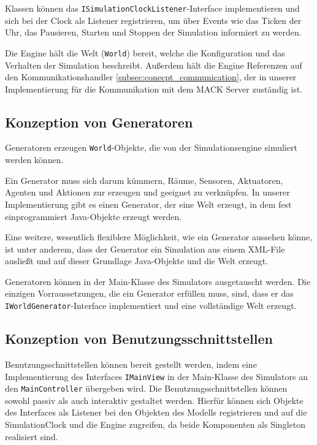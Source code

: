 Klassen können das \texttt{ISimulationClockListener}-Interface implementieren und sich bei der Clock als Listener registrieren, um über Events wie das Ticken der Uhr, das Pausieren, Starten und Stoppen der Simulation informiert zu werden.

Die Engine hält die Welt (\texttt{World}) bereit, welche die Konfiguration und das Verhalten der Simulation beschreibt. Außerdem hält die Engine Referenzen auf den Kommunikationshandler \ref{subsec:conecpt_communication}, der in unserer Implementierung für die Kommunikation mit dem MACK Server zuständig ist.

\subsection{Konzeption von Generatoren}\label{subsec:concept_generators}
Generatoren erzeugen \texttt{World}-Objekte, die von der Simulationsengine simuliert werden können.

Ein Generator muss sich darum kümmern, Räume, Sensoren, Aktuatoren, Agenten und Aktionen zur erzeugen und geeignet zu verknüpfen. In unserer Implementierung gibt es einen Generator, der eine Welt erzeugt, in dem fest einprogrammiert Java-Objekte erzeugt werden.

Eine weitere, wesentlich flexiblere Möglichkeit, wie ein Generator aussehen könne, ist unter anderem, dass der Generator ein Simulation aus einem XML-File ausließt und auf dieser Grundlage Java-Objekte und die Welt erzeugt.

Generatoren können in der Main-Klasse des Simulators ausgetauscht werden. Die einzigen Vorraussetzungen, die ein Generator erfüllen muss, sind, dass er das \texttt{IWorldGenerator}-Interface implementiert und eine vollständige Welt erzeugt.


\subsection{Konzeption von Benutzungsschnittstellen}\label{subsec:concept_interfaces}
Benutzungsschnittstellen können bereit gestellt werden, indem eine Implementierung des Interfaces \texttt{IMainView} in der Main-Klasse des Simulators an den \texttt{MainController} übergeben wird. Die Benutzungsschnittstellen können sowohl passiv als auch interaktiv gestaltet werden. Hierfür können sich Objekte des Interfaces als Listener bei den Objekten des Modells registrieren und auf die SimulationClock und die Engine zugreifen, da beide Komponenten als Singleton realisiert sind.

